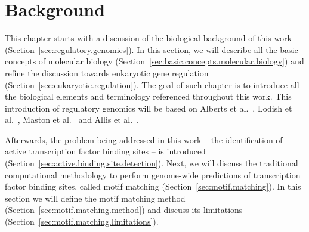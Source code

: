 \chapter{Background}
\label{cha:background}

\graphicspath{{chapter2/figs/}}

This chapter starts with a discussion of the biological background of this work (Section~\ref{sec:regulatory.genomics}). In this section, we will describe all the basic concepts of molecular biology (Section~\ref{sec:basic.concepts.molecular.biology}) and refine the discussion towards eukaryotic gene regulation (Section~\ref{sec:eukaryotic.regulation}). The goal of such chapter is to introduce all the biological elements and terminology referenced throughout this work. This introduction of regulatory genomics will be based on Alberts et al.~\cite{alberts2007}, Lodish et al.~\cite{lodish2007}, Maston et al.~\cite{maston2006} and Allis et al.~\cite{allis2007}.

Afterwards, the problem being addressed in this work -- the identification of active transcription factor binding sites -- is introduced (Section~\ref{sec:active.binding.site.detection}). Next, we will discuss the traditional computational methodology to perform genome-wide predictions of transcription factor binding sites, called motif matching (Section~\ref{sec:motif.matching}). In this section we will define the motif matching method (Section~\ref{sec:motif.matching.method}) and discuss its limitations (Section~\ref{sec:motif.matching.limitations}).


